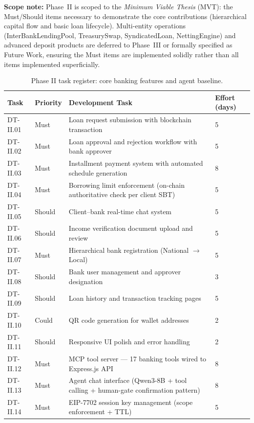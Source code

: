 \documentclass[12pt,a4paper]{report}
\begin{document}
\textbf{Scope note:} Phase~II is scoped to the \textit{Minimum Viable Thesis} (MVT): the Must/Should items necessary to demonstrate the core contributions (hierarchical capital flow and basic loan lifecycle). Multi-entity operations (InterBankLendingPool, TreasurySwap, SyndicatedLoan, NettingEngine) and advanced deposit products are deferred to Phase~III or formally specified as Future Work, ensuring the Must items are implemented solidly rather than all items implemented superficially.

\begin{table}[H]
\centering
\caption{Phase II task register: core banking features and agent baseline.}
\label{tab:phaseII}
\small
\begin{tabular}{p{1.8cm}p{1.8cm}p{7.5cm}p{1.5cm}}
\hline
\textbf{Task} & \textbf{Priority} & \textbf{Development Task} & \textbf{Effort (days)} \\
\hline
DT-II.01 & Must & Loan request submission with blockchain transaction & 5 \\
DT-II.02 & Must & Loan approval and rejection workflow with bank approver & 5 \\
DT-II.03 & Must & Installment payment system with automated schedule generation & 8 \\
DT-II.04 & Must & Borrowing limit enforcement (on-chain authoritative check per client SBT) & 5 \\
DT-II.05 & Should & Client--bank real-time chat system & 5 \\
DT-II.06 & Should & Income verification document upload and review & 5 \\
DT-II.07 & Must & Hierarchical bank registration (National $\to$ Local) & 5 \\
DT-II.08 & Should & Bank user management and approver designation & 3 \\
DT-II.09 & Should & Loan history and transaction tracking pages & 5 \\
DT-II.10 & Could & QR code generation for wallet addresses & 2 \\
DT-II.11 & Should & Responsive UI polish and error handling & 2 \\
DT-II.12 & Must & MCP tool server --- 17 banking tools wired to Express.js API & 8 \\
DT-II.13 & Must & Agent chat interface (Qwen3-8B + tool calling + human-gate confirmation pattern) & 8 \\
DT-II.14 & Must & EIP-7702 session key management (scope enforcement + TTL) & 5 \\

\end{tabular}
\end{table}
\end{document}
